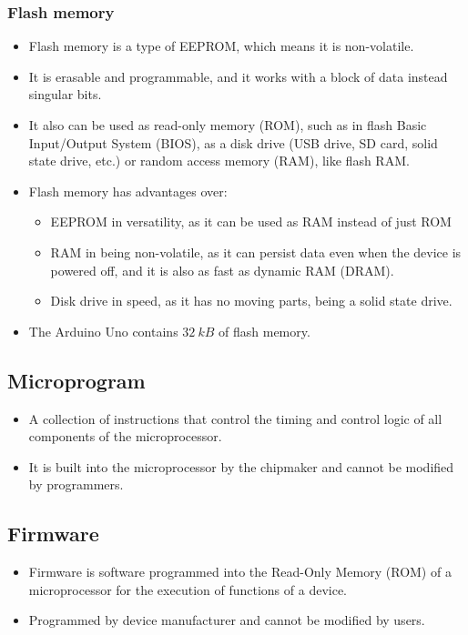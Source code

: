 \documentclass[11pt]{article}
\begin{document}
\subsubsection{Flash memory}
\label{sec:org1f7eb9a}
\begin{itemize}
\item Flash memory is a type of EEPROM, which means it is non-volatile.
\item It is erasable and programmable, and it works with a block of data instead singular bits.
\item It also can be used as read-only memory (ROM), such as in flash Basic Input/Output System (BIOS), as a disk drive (USB drive, SD card, solid state drive, etc.) or random access memory (RAM), like flash RAM.
\item Flash memory has advantages over:
\begin{itemize}
\item EEPROM in versatility, as it can be used as RAM instead of just ROM
\item RAM in being non-volatile, as it can persist data even when the device is powered off, and it is also as fast as dynamic RAM (DRAM).
\item Disk drive in speed, as it has no moving parts, being a solid state drive.
\end{itemize}
\item The Arduino Uno contains \(\qty{32}{kB}\) of flash memory.
\end{itemize}
\subsection{Microprogram}
\label{sec:org188fc57}
\begin{itemize}
\item A collection of instructions that control the timing and control logic of all components of the microprocessor.
\item It is built into the microprocessor by the chipmaker and cannot be modified by programmers.
\end{itemize}
\subsection{Firmware}
\label{sec:org286ea93}
\begin{itemize}
\item Firmware is software programmed into the Read-Only Memory (ROM) of a microprocessor for the execution of functions of a device.
\item Programmed by device manufacturer and cannot be modified by users.
\end{itemize}
\end{document}
